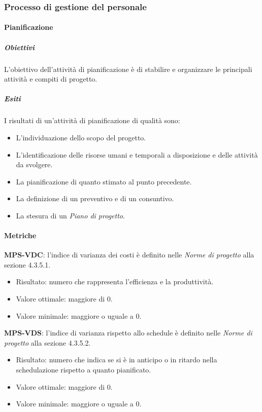 \documentclass[../piano-di-qualifica.tex]{subfiles}
\begin{document}
\subsubsection{Processo di gestione del personale}%
\label{subs:processo_di_gestione_del_personale}

\paragraph{Pianificazione}%
\label{par:pianificazione}

\subparagraph{Obiettivi}%
\label{subp:obiettivi_pers}
L'obiettivo dell'attività di pianificazione è di stabilire e organizzare le principali attività e compiti di progetto.

\subparagraph{Esiti}%
\label{subp:esiti_pers}
I risultati di un'attività di pianificazione di qualità sono:
\begin{itemize}
  \item L'individuazione dello scopo del progetto.
  \item L'identificazione delle risorse umani e temporali a disposizione e delle attività da svolgere.
  \item La pianificazione di quanto stimato al punto precedente.
  \item La definizione di un preventivo e di un consuntivo.
  \item La stesura di un \textit{Piano di progetto}.
\end{itemize}

\paragraph{Metriche}%
\label{par:metriche_pers}

\textbf{MPS-VDC}: l'indice di varianza dei costi è definito nelle \textit{Norme di progetto} alla sezione 4.3.5.1.
\begin{itemize}
  \item Risultato: numero che rappresenta l'efficienza e la produttività.
  \item Valore ottimale: maggiore di 0.
  \item Valore minimale: maggiore o uguale a 0.
\end{itemize}

\textbf{MPS-VDS}: l'indice di varianza rispetto allo schedule è definito nelle \textit{Norme di progetto} alla sezione 4.3.5.2.
\begin{itemize}
  \item Risultato: numero che indica se si è in anticipo o in ritardo nella schedulazione rispetto a quanto pianificato.
  \item Valore ottimale: maggiore di 0.
  \item Valore minimale: maggiore o uguale a 0.
\end{itemize}
\end{document}
